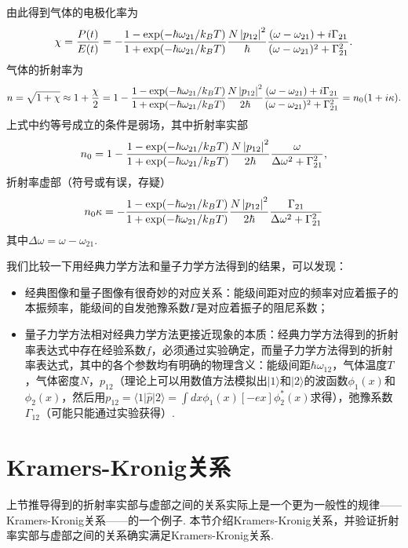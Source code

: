 \documentclass{assignment}
\begin{document}
由此得到气体的电极化率为
\begin{align}
    \chi=\frac{P(t)}{E(t)}=-\frac{1-\exp(-\hbar\omega_{21}/k_BT)}{1+\exp(-\hbar\omega_{21}/k_BT)}\frac{N\left\lvert p_{12}\right\rvert^2}{\hbar}\frac{(\omega-\omega_{21})+i\Gamma_{21}}{(\omega-\omega_{21})^2+\Gamma_{21}^2}.
\end{align}
气体的折射率为
\begin{align}
    n=\sqrt{1+\chi}\approx 1+\frac{\chi}{2}=1-\frac{1-\exp(-\hbar\omega_{21}/k_BT)}{1+\exp(-\hbar\omega_{21}/k_BT)}\frac{N\left\lvert p_{12}\right\rvert^2}{2\hbar}\frac{(\omega-\omega_{21})+i\Gamma_{21}}{(\omega-\omega_{21})^2+\Gamma_{21}^2}=n_0(1+i\kappa).
\end{align}
上式中约等号成立的条件是弱场，其中折射率实部
\begin{align}
    n_0=1-\frac{1-\exp(-\hbar\omega_{21}/k_BT)}{1+\exp(-\hbar\omega_{21}/k_BT)}\frac{N\left\lvert p_{12}\right\rvert^2}{2\hbar}\frac{\omega}{\Delta\omega^2+\Gamma_{21}^2},
\end{align}
折射率虚部（符号或有误，存疑）
\begin{align}
    n_0\kappa=-\frac{1-\exp(-\hbar\omega_{21}/k_BT)}{1+\exp(-\hbar\omega_{21}/k_BT)}\frac{N\left\lvert p_{12}\right\rvert^2}{2\hbar}\frac{\Gamma_{21}}{\Delta\omega^2+\Gamma_{21}^2}
\end{align}
其中$\Delta\omega=\omega-\omega_{21}$.

我们比较一下用经典力学方法和量子力学方法得到的结果，可以发现：
\begin{itemize}
    \item 经典图像和量子图像有很奇妙的对应关系：能级间距对应的频率对应着振子的本振频率，能级间的自发弛豫系数$\Gamma$是对应着振子的阻尼系数；
    \item 量子力学方法相对经典力学方法更接近现象的本质：经典力学方法得到的折射率表达式中存在经验系数$f$，必须通过实验确定，而量子力学方法得到的折射率表达式，其中的各个参数均有明确的物理含义：能级间距$\hbar\omega_{12}$，气体温度$T$，气体密度$N$，$p_{12}$（理论上可以用数值方法模拟出$\lvert 1\rangle$和$\lvert 2\rangle$的波函数$\phi_1(x)$和$\phi_2(x)$，然后用$p_{12}=\langle 1\rvert\hat{p}\lvert 2\rangle=\int dx\phi_1(x)[-ex]\phi_2^*(x)$求得），弛豫系数$\Gamma_{12}$（可能只能通过实验获得）.
\end{itemize}

\section{Kramers-Kronig关系}
上节推导得到的折射率实部与虚部之间的关系实际上是一个更为一般性的规律——Kramers-Kronig关系——的一个例子. 本节介绍Kramers-Kronig关系，并验证折射率实部与虚部之间的关系确实满足Kramers-Kronig关系.
\end{document}
